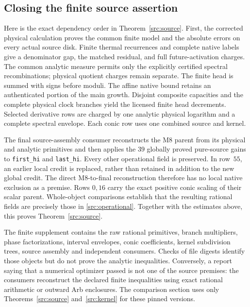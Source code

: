 \documentclass[11pt,a4paper]{article}
\theoremstyle{definition}
\theoremstyle{remark}
\begin{document}
\subsection{Closing the finite source assertion}
\label{src:close}

Here is the exact dependency order in Theorem~\ref{src:source}.
First, the corrected physical calculation proves the common finite
model and the absolute errors on every actual source disk.  Finite
thermal recurrences and complete native labels give a denominator gap,
the matched residual, and full future-activation charges.  The common
analytic measure permits only the explicitly certified spectral
recombinations; physical quotient charges remain separate.  The finite
head is summed with signs before moduli.  The affine native bound
retains an authenticated portion of the main growth.  Disjoint
composite capacities and the complete physical clock branches yield
the licensed finite head decrements.  Selected derivative rows are
charged by one analytic physical logarithm and a complete spectral
envelope.  Each conic row uses one combined source and kernel.

The final source-assembly consumer reconstructs the M8 parent from its
physical and analytic primitives and then applies the $39$ globally
proved pure-source gains to \texttt{first\_hi} and \texttt{last\_hi}.
Every other operational field is preserved. In row~$55$, an earlier
local credit is replaced, rather than retained in addition to the new
global credit. The direct M8-to-final reconstruction therefore has no
local native exclusion as a premise. Rows $0,16$ carry the exact positive
conic scaling of their scalar parent. Whole-object comparisons establish
that the resulting rational fields are precisely those in
\eqref{src:operational}. Together with the estimates above, this proves
Theorem~\ref{src:source}.

The finite supplement contains the raw rational primitives, branch
multipliers, phase factorizations, interval envelopes, conic coefficients,
kernel subdivision trees, source assembly and independent consumers.
Checks of file digests identify those objects but do not prove the
analytic inequalities.  Conversely, a report saying that a numerical
optimizer passed is not one of the source premises: the consumers
reconstruct the declared finite inequalities using exact rational
arithmetic or outward Arb enclosures.  The comparison section uses
only Theorems~\ref{src:source} and~\ref{src:kernel} for these pinned
versions.
\end{document}
